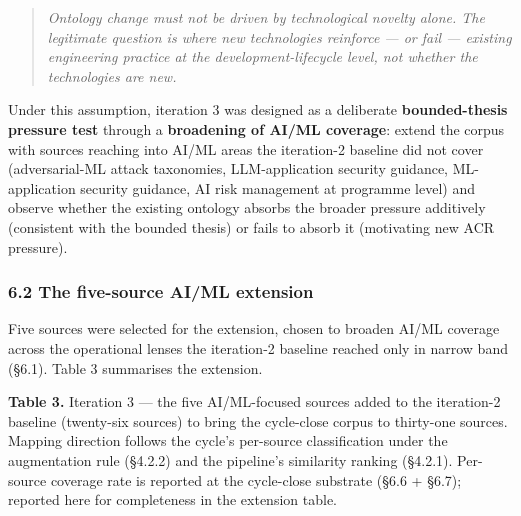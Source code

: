 \documentclass[
]{article}
\begin{document}
\begin{quote}
\emph{Ontology change must not be driven by technological novelty alone.
The legitimate question is where new technologies reinforce --- or fail
--- existing engineering practice at the development-lifecycle level,
not whether the technologies are new.}
\end{quote}

Under this assumption, iteration 3 was designed as a deliberate
\textbf{bounded-thesis pressure test} through a \textbf{broadening of
AI/ML coverage}: extend the corpus with sources reaching into AI/ML
areas the iteration-2 baseline did not cover (adversarial-ML attack
taxonomies, LLM-application security guidance, ML-application security
guidance, AI risk management at programme level) and observe whether the
existing ontology absorbs the broader pressure additively (consistent
with the bounded thesis) or fails to absorb it (motivating new ACR
pressure).

\subsubsection{6.2 The five-source AI/ML
extension}\label{the-five-source-aiml-extension}

Five sources were selected for the extension, chosen to broaden AI/ML
coverage across the operational lenses the iteration-2 baseline reached
only in narrow band (§6.1). Table 3 summarises the extension.

\textbf{Table 3.} Iteration 3 --- the five AI/ML-focused sources added
to the iteration-2 baseline (twenty-six sources) to bring the
cycle-close corpus to thirty-one sources. Mapping direction follows the
cycle's per-source classification under the augmentation rule (§4.2.2)
and the pipeline's similarity ranking (§4.2.1). Per-source coverage rate
is reported at the cycle-close substrate (§6.6 + §6.7); reported here
for completeness in the extension table.
\end{document}
